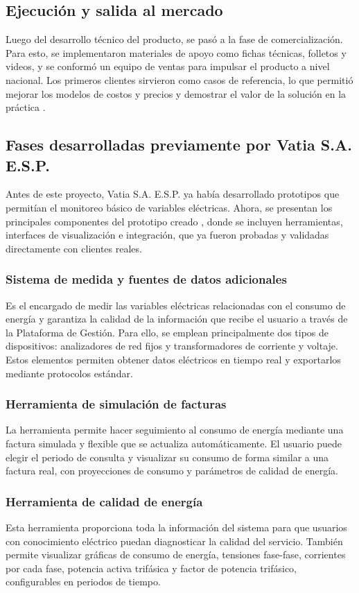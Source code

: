 \subsection{Ejecución y salida al mercado}
Luego del desarrollo técnico del producto, se pasó a la fase de comercialización. Para esto, se implementaron materiales de apoyo como fichas técnicas, folletos y videos, y se conformó un equipo de ventas para impulsar el producto a nivel nacional. Los primeros clientes sirvieron como casos de referencia, lo que permitió mejorar los modelos de costos y precios y demostrar el valor de la solución en la práctica \cite{Jaramillo2022}.

\subsection{Fases desarrolladas previamente por Vatia S.A. E.S.P.}
Antes de este proyecto, Vatia S.A. E.S.P. ya había desarrollado prototipos que permitían el monitoreo básico de variables eléctricas. Ahora, se presentan los principales componentes del prototipo creado \cite{Jaramillo2022}, donde se incluyen herramientas, interfaces de visualización e integración, que ya fueron probadas y validadas directamente con clientes reales.

\subsubsection{Sistema de medida y fuentes de datos adicionales}
Es el encargado de medir las variables eléctricas relacionadas con el consumo de energía y garantiza la calidad de la información que recibe el usuario a través de la Plataforma de Gestión. Para ello, se emplean principalmente dos tipos de dispositivos: analizadores de red fijos y transformadores de corriente y voltaje. Estos elementos permiten obtener datos eléctricos en tiempo real y exportarlos mediante protocolos estándar.

\subsubsection{Herramienta de simulación de facturas}
La herramienta permite hacer seguimiento al consumo de energía mediante una factura simulada y flexible que se actualiza automáticamente. El usuario puede elegir el periodo de consulta y visualizar su consumo de forma similar a una factura real, con proyecciones de consumo y parámetros de calidad de energía.

\subsubsection{Herramienta de calidad de energía}
Esta herramienta proporciona toda la información del sistema para que usuarios con conocimiento eléctrico puedan diagnosticar la calidad del servicio. También permite visualizar gráficas de consumo de energía, tensiones fase-fase, corrientes por cada fase, potencia activa trifásica y factor de potencia trifásico, configurables en periodos de tiempo.

